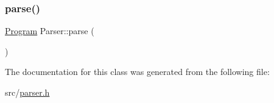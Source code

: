 \subsubsection{\texorpdfstring{parse()}{parse()}}
{\footnotesize\ttfamily \hyperlink{struct_program}{Program} Parser\+::parse (\begin{DoxyParamCaption}{ }\end{DoxyParamCaption})\hspace{0.3cm}{\ttfamily [inline]}}



The documentation for this class was generated from the following file\+:\begin{DoxyCompactItemize}
\item 
src/\hyperlink{parser_8h}{parser.\+h}\end{DoxyCompactItemize}
